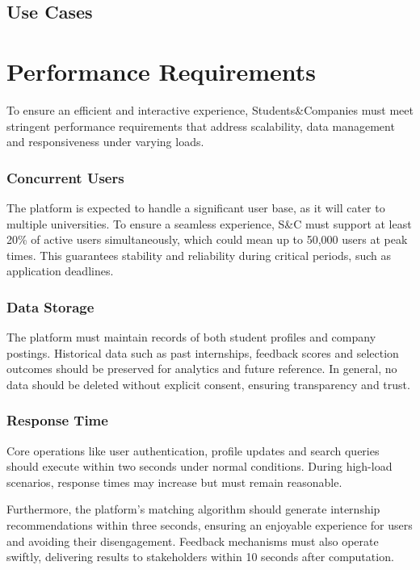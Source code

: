\subsection{Use Cases}


\section{Performance Requirements}
To ensure an efficient and interactive experience, Students\&Companies must meet stringent performance requirements that address scalability, data management and responsiveness under varying loads.

\subsubsection{Concurrent Users}
The platform is expected to handle a significant user base, as it will cater to multiple universities.
To ensure a seamless experience, S\&C must support at least 20\% of active users simultaneously, which could mean up to 50,000 users at peak times.
This guarantees stability and reliability during critical periods, such as application deadlines.

\subsubsection{Data Storage}
The platform must maintain records of both student profiles and company postings.
Historical data such as past internships, feedback scores and selection outcomes should be preserved for analytics and future reference.
In general, no data should be deleted without explicit consent, ensuring transparency and trust.

\subsubsection{Response Time}
Core operations like user authentication, profile updates and search queries should execute within two seconds under normal conditions.
During high-load scenarios, response times may increase but must remain reasonable.

Furthermore, the platform's matching algorithm should generate internship recommendations within three seconds, ensuring an enjoyable experience for users and avoiding their disengagement.
Feedback mechanisms must also operate swiftly, delivering results to stakeholders within 10 seconds after computation.

